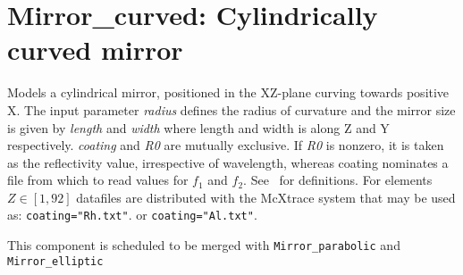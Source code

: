 \section{Mirror\_curved: Cylindrically curved mirror}


Models a cylindrical mirror, positioned in the XZ-plane curving towards
positive X. The input parameter \textit{radius} defines the radius of curvature
and the mirror size is given by \textit{length} and \textit{width} where length
and width is along Z and Y respectively. \textit{coating} and \textit{R0} are mutually
exclusive. If \textit{R0} is nonzero, it is taken as the reflectivity value,
irrespective of wavelength, whereas coating nominates a file from which to read
values for $f_1$ and $f_2$. See~\cite{NIST-ffast} for definitions. For
elements $Z\in[1,92]$ datafiles are distributed with the McXtrace system that
may be used as: \verb+coating="Rh.txt"+. or \verb+coating="Al.txt"+. 

This component is scheduled to be merged with \texttt{Mirror\_parabolic} and \texttt{Mirror\_elliptic} 
